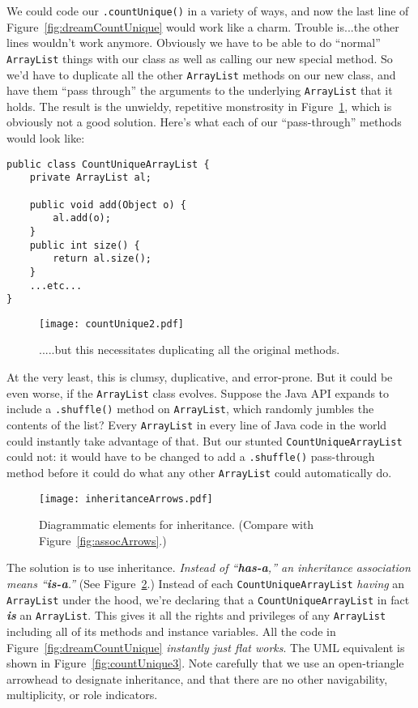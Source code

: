We could code our \texttt{.countUnique()} in a variety of ways, and now the
last line of Figure~\ref{fig:dreamCountUnique} would work like a charm.
Trouble is...the other lines wouldn't work anymore. Obviously we have to be
able to do ``normal'' \texttt{ArrayList} things with our class as well as
calling our new special method. So we'd have to duplicate all the other
\texttt{ArrayList} methods on our new class, and have them ``pass through'' the
arguments to the underlying \texttt{ArrayList} that it holds. The result is
the unwieldy, repetitive monstrosity in Figure~\ref{fig:countUnique2}, which
is obviously not a good solution. Here's what each of our ``pass-through''
methods would look like:

\begin{Verbatim}[fontsize=\small,samepage=true,frame=single]
public class CountUniqueArrayList {
    private ArrayList al;

    public void add(Object o) {
        al.add(o);
    }
    public int size() {
        return al.size();
    }
    ...etc...
}\end{Verbatim}


\begin{figure}
\centering
\texttt{[image: countUnique2.pdf]}  %
\caption{.....but this necessitates duplicating all the original methods.}
\label{fig:countUnique2}
\end{figure}

At the very least, this is clumsy, duplicative, and error-prone. But it could
be even worse, if the \texttt{ArrayList} class evolves. Suppose the Java API
expands to include a \texttt{.shuffle()} method on \texttt{ArrayList}, which
randomly jumbles the contents of the list? Every \texttt{ArrayList} in every
line of Java code in the world could instantly take advantage of that. But our
stunted \texttt{CountUniqueArrayList} could not: it would have to be changed
to add a \texttt{.shuffle()} pass-through method before it could do what any
other \texttt{ArrayList} could automatically do.

\label{page:inheritanceArrows}
\begin{figure}[h]
\centering
\texttt{[image: inheritanceArrows.pdf]}
\caption{Diagrammatic elements for inheritance. (Compare with
Figure~\ref{fig:assocArrows}.)}
\label{fig:inheritanceArrows}
\end{figure}

The solution is to use inheritance. \textit{Instead of ``\textbf{has-a},'' an
inheritance association means ``\textbf{is-a}.''} (See
Figure~\ref{fig:inheritanceArrows}.) Instead of each
\texttt{CountUniqueArrayList} \textit{having} an \texttt{ArrayList} under the
hood, we're declaring that a \texttt{CountUniqueArrayList} in fact
\textbf{\textit{is}} an \texttt{ArrayList}. This gives it all the rights and
privileges of any \texttt{ArrayList} including all of its methods and instance
variables. All the code in Figure~\ref{fig:dreamCountUnique} \textit{instantly
just flat works}. The UML equivalent is shown in
Figure~\ref{fig:countUnique3}. Note carefully that we use an open-triangle
arrowhead to designate inheritance, and that there are no other navigability,
multiplicity, or role indicators.

